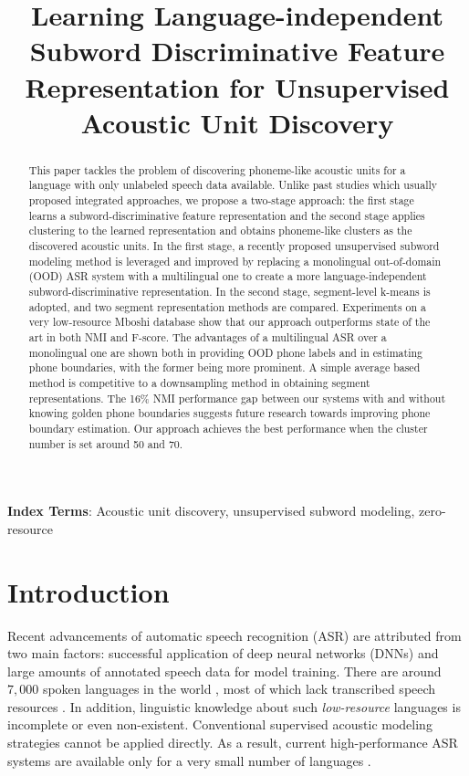 \documentclass[a4paper]{article}
\title{Learning Language-independent Subword Discriminative Feature Representation for Unsupervised Acoustic Unit Discovery}
\begin{document}
\maketitle
% 
\begin{abstract}
This paper tackles the problem of discovering  phoneme-like acoustic units for a language with only unlabeled speech data available. Unlike   past studies which usually proposed integrated approaches, we propose a two-stage approach: the first stage learns a   subword-discriminative feature  representation and the second stage applies clustering   to the learned representation and obtains phoneme-like  clusters as the discovered acoustic units. In the first stage, a recently proposed unsupervised subword modeling method is leveraged and improved by replacing a monolingual out-of-domain (OOD) ASR system with a multilingual one to create a more language-independent subword-discriminative representation. In the second stage,  segment-level k-means is adopted, and two segment representation methods are compared. Experiments   on a very low-resource Mboshi database show that our approach outperforms state of the art in both NMI and F-score. The advantages of a multilingual ASR over a monolingual one are shown both in providing OOD phone labels and in estimating   phone boundaries, with the former being more prominent. A simple average based method is competitive to a downsampling method in obtaining segment representations.
The 16\% NMI performance gap between our systems with and without knowing golden phone boundaries suggests future research towards improving  phone boundary estimation. Our  approach achieves the best performance when the cluster number is set around 50 and 70.
 \end{abstract}
\noindent\textbf{Index Terms}:  
Acoustic unit discovery, unsupervised subword modeling, zero-resource
\section{Introduction}
Recent advancements of automatic speech recognition (ASR)   \cite{dahl2012context,Li2020comparison} are attributed from two main factors: successful application of deep neural networks (DNNs) and large amounts of  annotated speech data for model training. There are around $7,000$ spoken languages in the world \cite{austin2011cambridge}, most of which   lack transcribed speech resources \cite{speech2020scharenborg}. In addition, linguistic knowledge about such  \textit{low-resource} languages is incomplete or even non-existent. Conventional supervised acoustic modeling strategies \cite{dahl2011context,chan2016listen,graves2014towards,graves2012RNN_T} cannot be applied directly. As a result, current high-performance ASR systems are available only for a very small number of languages \cite{feng2021how}.
\end{document}
